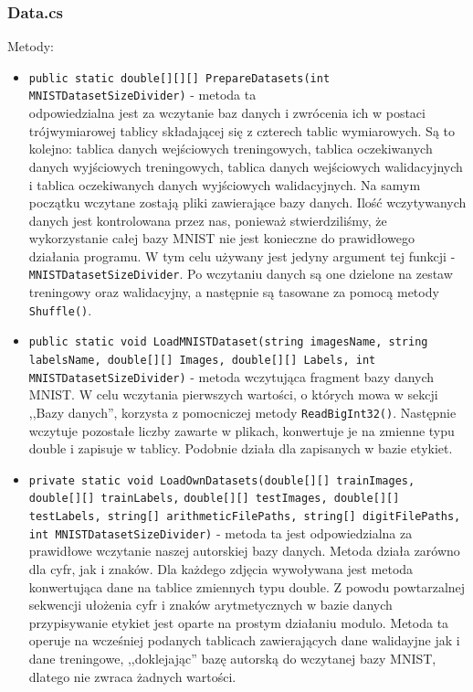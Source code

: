 \documentclass[12pt,a4paper]{article}
\begin{document}
\subsubsection*{Data.cs}
Metody:
\begin{itemize}
    \item \lstinline{public static double[][][] PrepareDatasets(int MNISTDatasetSizeDivider)} - 	metoda ta \\ odpowiedzialna jest za wczytanie baz danych i zwrócenia ich w postaci trójwymiarowej tablicy składającej się z czterech tablic wymiarowych. Są to kolejno: tablica danych wejściowych treningowych, tablica oczekiwanych danych wyjściowych treningowych, tablica danych wejściowych walidacyjnych i tablica oczekiwanych danych wyjściowych walidacyjnych. Na samym początku wczytane zostają pliki zawierające bazy danych. Ilość wczytywanych danych jest kontrolowana przez nas, ponieważ stwierdziliśmy, że wykorzystanie całej bazy MNIST nie jest konieczne do prawidłowego działania programu. W tym celu używany jest jedyny argument tej funkcji - \lstinline{MNISTDatasetSizeDivider}. Po wczytaniu danych są one dzielone na zestaw treningowy oraz walidacyjny, a następnie są tasowane za pomocą metody \lstinline{Shuffle()}.
    \item \lstinline{public static void LoadMNISTDataset(string imagesName, string labelsName, double[][] Images, double[][] Labels, int MNISTDatasetSizeDivider)} - metoda wczytująca fragment bazy danych MNIST. W celu wczytania pierwszych wartości, o których mowa w sekcji ,,Bazy danych'', korzysta z pomocniczej metody \lstinline{ReadBigInt32()}. Następnie wczytuje pozostałe liczby zawarte w plikach, konwertuje je na zmienne typu double i zapisuje w tablicy. Podobnie działa dla zapisanych w bazie etykiet.
	\item \lstinline{private static void LoadOwnDatasets(double[][] trainImages, double[][] trainLabels,} \newline \lstinline{double[][] testImages, double[][] testLabels, string[] arithmeticFilePaths, string[] digitFilePaths, int MNISTDatasetSizeDivider)} - metoda ta jest odpowiedzialna za prawidłowe wczytanie naszej autorskiej bazy danych. Metoda działa zarówno dla cyfr, jak i znaków. Dla każdego zdjęcia wywoływana jest metoda konwertująca dane na tablice zmiennych typu double. Z powodu powtarzalnej sekwencji ułożenia cyfr i znaków arytmetycznych w bazie danych przypisywanie etykiet jest oparte na prostym działaniu modulo. Metoda ta operuje na wcześniej podanych tablicach zawierających dane walidayjne jak i dane treningowe, ,,doklejając'' bazę autorską do wczytanej bazy MNIST, dlatego nie zwraca żadnych wartości.

\end{itemize}
\end{document}
